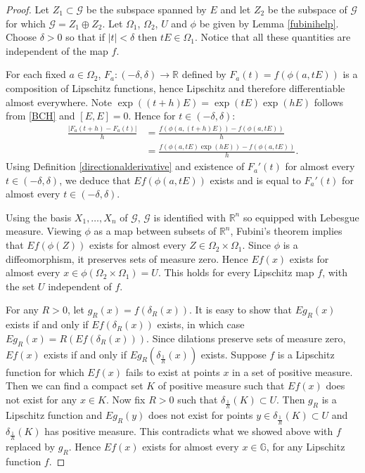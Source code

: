 \documentclass[reqno, 11pt]{amsart}
\theoremstyle{definition}
\theoremstyle{remark}
\numberwithin{theorem}{section}
\numberwithin{equation}{section}
\begin{document}
\begin{proof}
Let $Z_{1}\subset \mathcal{G}$ be the subspace spanned by $E$ and let $Z_{2}$ be the subspace of $\mathcal{G}$ for which $\mathcal{G}=Z_{1}\oplus Z_{2}$. Let $\Omega_{1}$, $\Omega_{2}$, $U$ and $\phi$ be given by Lemma \ref{fubinihelp}. Choose $\delta>0$ so that if $|t|<\delta$ then $tE\in \Omega_{1}$. Notice that all these quantities are independent of the map $f$.

For each fixed $a\in \Omega_{2}$, $F_a\colon (-\delta,\delta) \to \mathbb{R}$ defined by $F_a(t)=f(\phi(a,tE))$ is a composition of Lipschitz functions, hence Lipschitz and therefore differentiable almost everywhere. Note $\exp((t+h)E)=\exp(tE)\exp(hE)$ follows from \eqref{BCH} and $[E,E]=0$. Hence for $t\in (-\delta,\delta)$:
\begin{align*}
\frac{|F_{a}(t+h)-F_{a}(t)|}{h}&=\frac{f(\phi(a,(t+h)E))-f(\phi(a,tE))}{h}\\
&=\frac{f(\phi(a,tE)\exp(hE))-f(\phi(a,tE))}{h}.
\end{align*}
Using Definition \ref{directionalderivative} and existence of $F_{a}'(t)$ for almost every $t\in (-\delta, \delta)$, we deduce that $Ef(\phi(a,tE))$ exists and is equal to $F_{a}'(t)$ for almost every $t\in (-\delta, \delta)$.

Using the basis $X_{1}, \ldots, X_{n}$ of $\mathcal{G}$, $\mathcal{G}$ is identified with $\mathbb{R}^n$ so equipped with Lebesgue measure. Viewing $\phi$ as a map between subsets of $\mathbb{R}^{n}$, Fubini's theorem implies that $Ef(\phi(Z))$ exists for almost every $Z \in \Omega_{2}\times \Omega_{1}$. Since $\phi$ is a diffeomorphism, it preserves sets of measure zero. Hence $Ef(x)$ exists for almost every $x\in \phi(\Omega_{2}\times \Omega_{1})=U$. This holds for every Lipschitz map $f$, with the set $U$ independent of $f$.

For any $R>0$, let $g_{R}(x)=f(\delta_{R}(x))$. It is easy to show that $Eg_{R}(x)$ exists if and only if $Ef(\delta_{R}(x))$ exists, in which case $Eg_{R}(x)=R(Ef(\delta_{R}(x)))$. Since dilations preserve sets of measure zero, $Ef(x)$ exists if and only if $Eg_{R}(\delta_{\frac{1}{R}}(x))$ exists. Suppose $f$ is a Lipschitz function for which $Ef(x)$ fails to exist at points $x$ in a set of positive measure. Then we can find a compact set $K$ of positive measure such that $Ef(x)$ does not exist for any $x\in K$. Now fix $R>0$ such that $\delta_{\frac{1}{R}}(K)\subset U$. Then $g_{R}$ is a Lipschitz function and $Eg_{R}(y)$ does not exist for points $y\in \delta_{\frac{1}{R}}(K)\subset U$ and $\delta_{\frac{1}{R}}(K)$ has positive measure. This contradicts what we showed above with $f$ replaced by $g_{R}$. Hence $Ef(x)$ exists for almost every $x\in \mathbb{G}$, for any Lipschitz function $f$.
\end{proof}
\end{document}
